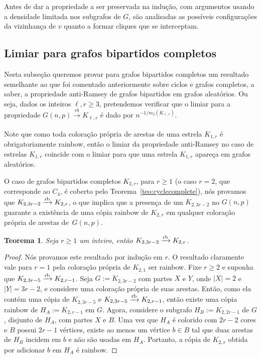 \documentclass[11pt,twoside,a4paper]{book}
\newcommand{\K}{K_{\ell,r}} %
\newcommand{\rb}{\xrightarrow{\text{\rm rb}}}
\newtheorem{teorema}{Teorema}[section]
\theoremstyle{note}
\begin{document}
    Antes de dar a propriedade a ser preservada na indução, com argumentos usando a densidade limitada nos subgrafos de $G$, são analisadas as possíveis configurações da vizinhança de $v$ quanto a formar cliques que se interceptam. 
 
 
\subsection{Limiar para grafos bipartidos completos}

    Nesta subseção queremos provar para grafos bipartidos completos um resultado semelhante ao que foi comentado anteriormente sobre ciclos e grafos completos, a saber, a propriedade anti-Ramsey de grafos bipartidos em grafos aleatórios.
    Ou seja, dados os inteiros $\ell,r \geq 3$, pretendemos verificar que o limiar para a propriedade $G(n,p) \xrightarrow[]{rb} \K$ é dado por $n^{-1/m_2(\K)}$.

    Note que como toda coloração própria de arestas de uma estrela $K_{1,r}$ é obrigatoriamente rainbow, então
    o limiar da propriedade anti-Ramsey no caso de estrelas $K_{1,r}$ coincide com o limiar para que uma estrela $K_{1,r}$ apareça em grafos aleatórios.

    O caso de grafos bipartidos completos $K_{2,r}$, para $r\geq 1$ (o caso $r=2$, que corresponde ao $C_4$, é coberto pelo
    Teorema~\ref{teo:cyclecomplete}),
    nós provamos que $K_{2,3r-2} \rb K_{2,r}$, 
    o que implica que  a presença de um $K_{2,3r-2}$ no
    $G(n,p)$ guarante a existência de uma cópia rainbow de $K_{2,r}$ em qualquer coloração própria de arestas de~$G(n,p)$.  

     \begin{teorema}\label{teo:below} Seja $r\geq 1$ um inteiro, então
    $K_{2,3r-2} \rb K_{2,r}$.
     \end{teorema}
     \begin{proof} Nós provamos este resultado por indução em $r$. 
     O resultado claramente vale para $r=1$ pela coloração própria de $K_{2,1}$ ser rainbow. 
     Fixe $r\geq 2$ e suponha que $K_{2,3r-5} \rb K_{2,r-1}$. 
     Seja $G:=K_{2,3r-2}$ com partes $X$ e $Y$, onde $|X|=2$ e $|Y|=3r-2$, e considere uma coloração própria de suas arestas.
     Então, como ela contém uma cópia de $K_{2,3r-5}$ e $K_{2,3r-5} \rb K_{2,r-1}$, então existe uma 
     cópia rainbow de $H_A:=K_{2,r-1}$ em $G$.
     Agora, considere  o subgrafo $H_B:=K_{2,2r-1}$ de $G$, disjunto de $H_A$, com partes $X$ e $B$. 
     Uma vez que $H_A$ é colorido com $2r-2$ cores e $B$ possui
    $2r-1$ vértices, existe ao menos um vértice $b\in B$ tal que
    duas arestas de $H_B$ incidem em $b$ e não são usadas em $H_A$. 
    Portanto, a cópia de $K_{2,r}$ obtida por adicionar $b$ em $H_A$ é rainbow.
     \end{proof}
    
\end{document}
